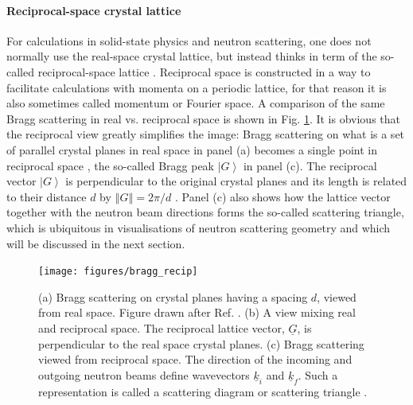 \paragraph{Reciprocal-space crystal lattice}
For calculations in solid-state physics and neutron scattering, one does not normally use
the real-space crystal lattice, but instead thinks in term of the so-called reciprocal-space
lattice \cite[pp. 11-15]{Shirane2002}.
Reciprocal space is constructed in a way to facilitate calculations with momenta on a periodic lattice,
for that reason it is also sometimes called momentum or Fourier space.
A comparison of the same Bragg scattering in real vs. reciprocal space is shown in Fig. \ref{fig:braggscattering_recip}.
It is obvious that the reciprocal view greatly simplifies the image: Bragg scattering on what is a set of parallel
crystal planes in real space in panel (a) becomes a single point in reciprocal space \cite[p. 66]{Gross2012},
the so-called Bragg peak $\left| G \right>$ in panel (c). The reciprocal vector $\left| G \right>$ is
perpendicular to the original crystal planes and its length is related to their distance $d$ by
$\left\Vert G \right\Vert = 2\pi/d$ \cite[p. 66]{Gross2012}. Panel (c) also shows how the lattice vector
together with the neutron beam directions forms the so-called scattering triangle, which is 
ubiquitous in visualisations of neutron scattering geometry \cite[pp. 14-15]{Shirane2002} and which will be 
discussed in the next section.
\begin{figure}[htb]
	\centering
	\texttt{[image: figures/bragg\_recip]}
	\caption[Real and reciprocal lattice scattering.]{
		(a) Bragg scattering on crystal planes having a spacing $d$, viewed from real space.
			Figure drawn after Ref. \cite[p. 68, Fig. 2.7]{Gross2012}.
		(b) A view mixing real and reciprocal space. The reciprocal lattice vector, $\underline{G}$,
			is perpendicular to the real space crystal planes.
		(c) Bragg scattering viewed from reciprocal space. The direction of the incoming and outgoing
			neutron beams define wavevectors $\underline{k}_i$ and $\underline{k}_f$.
			Such a representation is called a scattering diagram or scattering triangle
			\cite[p. 14, Fig. 1.5]{Shirane2002}.}
	\label{fig:braggscattering_recip}
\end{figure}

